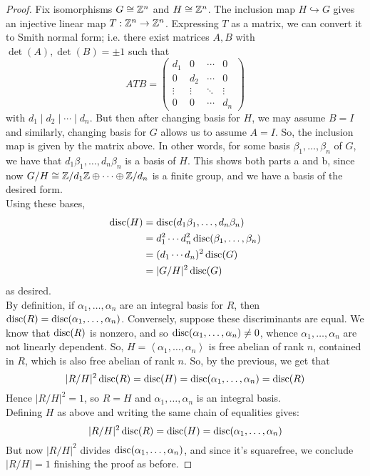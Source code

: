 \begin{proof}
	Fix isomorphisms $G \cong \mathbb{Z}^n$ and $H \cong \mathbb{Z}^n$. The inclusion map $H \hookrightarrow G$ gives an injective linear map $T : \mathbb{Z}^n \to \mathbb{Z}^n$. Expressing $T$ as a matrix, we can convert it to Smith normal form; i.e. there exist matrices $A,B$ with $\det(A),\det(B) = \pm 1$ such that
	\[ ATB = \left(\begin{array}{cccc} d_1 & 0 & \cdots & 0 \\ 0 & d_2 & \cdots & 0 \\ \vdots & \vdots & \ddots & \vdots \\ 0 & 0 & \cdots & d_n \end{array}\right) \]
	with $d_1 \mid d_2 \mid \cdots \mid d_n$. But then after changing basis for $H$, we may assume $B = I$ and similarly, changing basis for $G$ allows us to assume $A = I$. So, the inclusion map is given by the matrix above. In other words, for some basis $\beta_1,\ldots,\beta_n$ of $G$, we have that $d_1\beta_1,\ldots,d_n\beta_n$ is a basis of $H$. This shows both parts a and b, since now $G/H \cong \mathbb{Z}/d_1\mathbb{Z} \oplus \cdots \oplus \mathbb{Z}/d_n$ is a finite group, and we have a basis of the desired form. \\
	
	Using these bases,
	\begin{align*}
	\operatorname{disc}(H)
		&= \operatorname{disc}(d_1\beta_1,\ldots,d_n\beta_n) \\
		&= d_1^2 \cdots d_n^2 \operatorname{disc}(\beta_1,\ldots,\beta_n) \\
		&= (d_1 \cdots d_n)^2\operatorname{disc}(G) \\
		&= |G/H|^2\operatorname{disc}(G)
	\end{align*}
	as desired. \\
	
	By definition, if $\alpha_1,\ldots,\alpha_n$ are an integral basis for $R$, then $\operatorname{disc}(R) = \operatorname{disc}(\alpha_1,\ldots,\alpha_n)$. Conversely, suppose these discriminants are equal. We know that $\operatorname{disc}(R)$ is nonzero, and so $\operatorname{disc}(\alpha_1,\ldots,\alpha_n) \neq 0$, whence $\alpha_1,\ldots,\alpha_n$ are not linearly dependent. So, $H = \left<\alpha_1,\ldots,\alpha_n\right>$ is free abelian of rank $n$, contained in $R$, which is also free abelian of rank $n$. So, by the previous, we get that
	\[ |R/H|^2\operatorname{disc}(R) = \operatorname{disc}(H) = \operatorname{disc}(\alpha_1,\ldots,\alpha_n) = \operatorname{disc}(R) \]
	Hence $|R/H|^2 = 1$, so $R = H$ and $\alpha_1,\ldots,\alpha_n$ is an integral basis. \\
	
	Defining $H$ as above and writing the same chain of equalities gives:
	\[ |R/H|^2\operatorname{disc}(R) = \operatorname{disc}(H) = \operatorname{disc}(\alpha_1,\ldots,\alpha_n) \]
	But now $|R/H|^2$ divides $\operatorname{disc}(\alpha_1,\ldots,\alpha_n)$, and since it's squarefree, we conclude $|R/H| = 1$ finishing the proof as before.
\end{proof}
